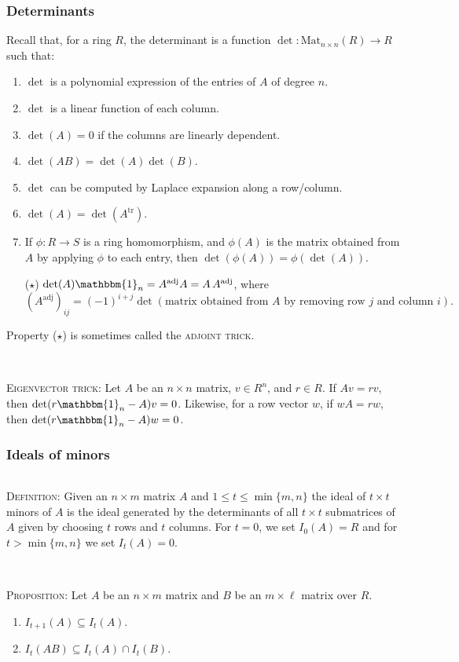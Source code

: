 \documentclass[12pt]{amsart}
\newcommand{\tr}{\mathrm{tr}}
\newcommand{\0}{$\phantom{.}$}
\newcommand{\1}{\mathbbm{1}}
\begin{document}
\subsubsection*{Determinants} Recall that, for a ring $R$, the determinant is a function $\det: \mathrm{Mat}_{n\times n}(R) \to R$ such that:
  \begin{enumerate}
  \item $\det$ is a polynomial expression of the entries of $A$ of degree $n$.
  \item $\det$ is a linear function of each column.
  \item $\det(A)=0$ if the columns are linearly dependent.
  \item $\det(AB)=\det(A)\det(B)$.
  \item $\det$ can be computed by Laplace expansion along a row/column.
  \item $\det(A) = \det(A^\tr)$.
  \item If $\phi:R\to S$ is a ring homomorphism, and $\phi(A)$ is the matrix obtained from $A$ by applying $\phi$ to each entry, then $\det(\phi(A)) = \phi(\det(A))$.
  \item[($\star$)] $\det(A) \mathbbm{1}_n = A^\mathrm{adj} A = A \, A^\mathrm{adj}$, where 
  \[(A^\mathrm{adj})_{ij}=(-1)^{i+j} \det( \text{matrix obtained from $A$ by removing row $j$ and column $i$}).\]
  \end{enumerate} 
 \noindent Property ($\star$) is sometimes called the \textsc{adjoint trick}.
 
 \
 
  \noindent \textsc{Eigenvector trick:} Let $A$ be an $n\times n$ matrix, $v\in R^n$, and $r\in R$. If $Av=rv$, then $\det(r \1_n - A) v = 0$. Likewise, for a row vector $w$, if $w A = rw$, then $\det(r \1_n - A) w = 0$.

\subsubsection*{Ideals of minors} \0

\noindent \textsc{Definition:} Given an $n\times m$ matrix $A$ and $1\leq t \leq \min\{m,n\}$ the ideal of $t\times t$ minors of $A$ is the ideal generated by the determinants of all $t\times t$ submatrices of $A$ given by choosing $t$ rows and $t$ columns. For $t=0$, we set $I_0(A)=R$ and for $t>\min\{m,n\}$ we set $I_t(A)=0$.

\

\noindent  \textsc{Proposition:} Let $A$ be an $n\times m$ matrix and $B$ be an $m\times \ell$ matrix over $R$.
\begin{enumerate}
\item $I_{t+1}(A) \subseteq I_{t}(A)$.
\item $I_t(AB) \subseteq I_t(A) \cap I_t(B)$.
\end{enumerate}
\end{document}
